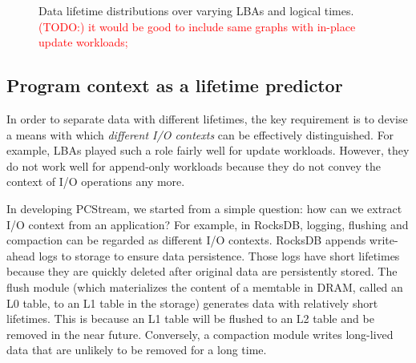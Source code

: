 \begin{figure}[t]
	\vspace{-10pt}
	\centering
	\vspace{-10pt}
	\caption{
		Data lifetime distributions over varying LBAs and logical times.
		\textcolor{red}{(TODO:) it would be good to include same graphs with
		in-place update workloads;}}
		\label{fig:lba_lifetime}
	\vspace{-15pt}
\end{figure}

\vspace{-5pt}
\subsection{Program context as a lifetime predictor}
In order to separate data with different lifetimes, the key requirement is to devise 
a means with which {\it different I/O contexts} can be effectively distinguished.  
For example, LBAs played such a role fairly well for update workloads.  
However, they do not work well for append-only workloads because 
they do not convey the context of I/O operations any more.  

In developing PCStream, we started from a simple question: 
how can we extract I/O context from an application? 
For example, in RocksDB, logging, flushing and compaction can be regarded
as different I/O contexts.
RocksDB appends write-ahead logs to storage to ensure data
persistence.  Those logs have short lifetimes because they are quickly deleted
after original data are persistently stored.
The flush module (which materializes the content of a memtable in
DRAM, called an L0 table, to an L1 table in the storage) generates data
with relatively short lifetimes. This is because an L1 table will be flushed to
an L2 table and be removed in the near future. Conversely, a compaction module
writes long-lived data that are unlikely to be removed for a long time.

